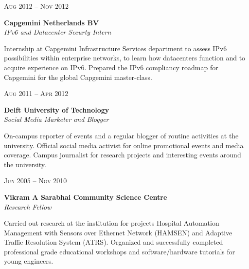 \documentclass[10pt]{article} %
\begin{document}
{\begin{minipage}[t]{0.5\textwidth}
{\raggedleft\textsc{Aug 2012 -- Nov 2012}\par}

{\raggedright\large \textbf{Capgemini Netherlands BV}\\
\textit{IPv6 and Datacenter Securty Intern}\\[5pt]}

\normalsize{Internship at Capgemini Infrastructure Services department to assess IPv6 possibilities within enterprise networks, to learn how datacenters function and to acquire experience on IPv6. Prepared the IPv6 compliancy roadmap for Capgemini for the global Capgemini master-class. }\\


{\raggedleft\textsc{Aug 2011 -- Apr 2012}\par}

{\raggedright\large \textbf{Delft University of Technology}\\
\textit{Social Media Marketer and Blogger}\\[5pt]}

\normalsize{On-campus reporter of events and a regular blogger of routine activities at the university. Official social media activist for online promotional events and media coverage. Campus journalist for research projects and interesting events around the university.}\\


{\raggedleft\textsc{Jun 2005 -- Nov 2010}\par}

{\raggedright\large \textbf{Vikram A Sarabhai Community Science Centre}\\
\textit{Research Fellow}\\[5pt]}

\normalsize{Carried out research at the institution for projects Hospital Automation Management with Sensors over Ethernet Network (HAMSEN) and Adaptive Traffic Resolution System (ATRS). Organized and successfully completed professional grade educational workshops and software/hardware tutorials for young engineers.}\\



\end{minipage}}
\end{document}
